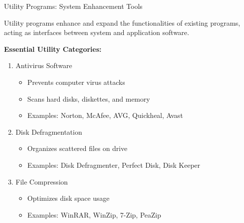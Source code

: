 \documentclass[aspectratio=169]{beamer}
\begin{document}
\begin{frame}{Utility Programs: System Enhancement Tools}
    \begin{definition}
        Utility programs enhance and expand the functionalities of existing programs, acting as interfaces between system and application software.
    \end{definition}
    
    \vspace{0.3cm}
    \textbf{Essential Utility Categories:}
    
    \begin{enumerate}
        \item Antivirus Software
        \begin{itemize}
            \item Prevents computer virus attacks
            \item Scans hard disks, diskettes, and memory
            \item Examples: Norton, McAfee, AVG, Quickheal, Avast
        \end{itemize}
        
        \item Disk Defragmentation
        \begin{itemize}
            \item Organizes scattered files on drive
            \item Examples: Disk Defragmenter, Perfect Disk, Disk Keeper
        \end{itemize}
        
        \item File Compression
        \begin{itemize}
            \item Optimizes disk space usage
            \item Examples: WinRAR, WinZip, 7-Zip, PeaZip
        \end{itemize}
    \end{enumerate}
\end{frame}
\end{document}
